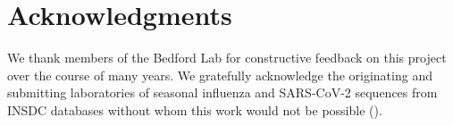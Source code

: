 \documentclass[10pt,letterpaper]{article}
\begin{document}
\section*{Acknowledgments}

We thank members of the Bedford Lab for constructive feedback on this project over the course of many years.
We gratefully acknowledge the originating and submitting laboratories of seasonal influenza and SARS-CoV-2 sequences from INSDC databases without whom this work would not be possible ().

\nolinenumbers

%
%
%







\end{document}
